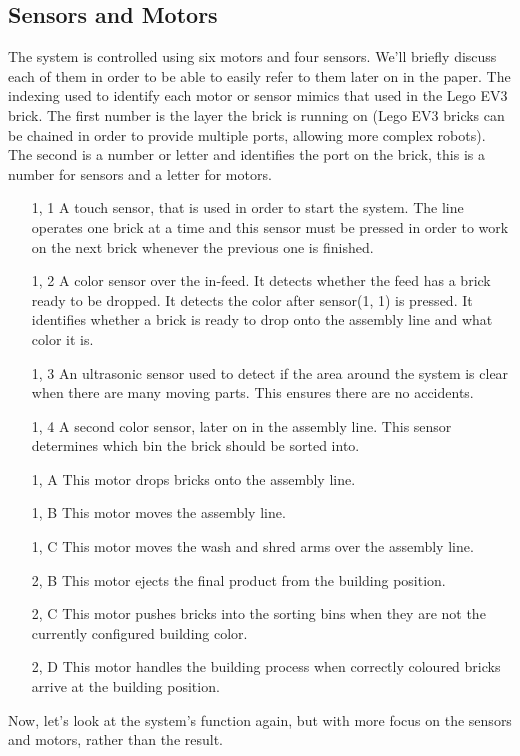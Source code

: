 \documentclass[conference]{IEEEtran}
\begin{document}
\subsection{Sensors and Motors}
The system is controlled using six motors and four sensors. We'll briefly discuss each of them in order to be able to easily refer to them later on in the paper. The indexing used to identify each motor or sensor mimics that used in the Lego EV3 brick. The first number is the layer the brick is running on (Lego EV3 bricks can be chained in order to provide multiple ports, allowing more complex robots). The second is a number or letter and identifies the port on the brick, this is a number for sensors and a letter for motors. 
\begin{itemize}
\item[1, 1] A touch sensor, that is used in order to start the system. The line operates one brick at a time and this sensor must be pressed in order to work on the next brick whenever the previous one is finished.
\item[1, 2] A color sensor over the in-feed. It detects whether the feed has a brick ready to be dropped. It detects the color after sensor(1, 1) is pressed. It identifies whether a brick is ready to drop onto the assembly line and what color it is.
\item[1, 3] An ultrasonic sensor used to detect if the area around the system is clear when there are many moving parts. This ensures there are no accidents.
\item[1, 4] A second color sensor, later on in the assembly line. This sensor determines which bin the brick should be sorted into. 

\item[1, A] This motor drops bricks onto the assembly line.
\item[1, B] This motor moves the assembly line.
\item[1, C] This motor moves the wash and shred arms over the assembly line.
\item[2, B] This motor ejects the final product from the building position.
\item[2, C] This motor pushes bricks into the sorting bins when they are not the currently configured building color.
\item[2, D] This motor handles the building process when correctly coloured bricks arrive at the building position. 
\end{itemize}

Now, let's look at the system's function again, but with more focus on the sensors and motors, rather than the result. 
\end{document}
